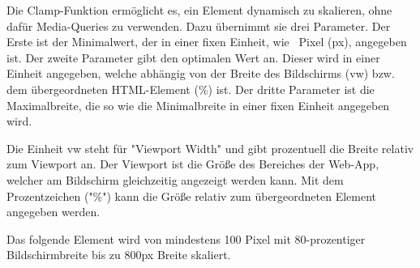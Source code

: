 \label{sec:clamp}

Die Clamp-Funktion ermöglicht es, ein Element dynamisch zu skalieren, ohne dafür Media-Queries zu verwenden. 
Dazu übernimmt sie drei Parameter. 
Der Erste ist der Minimalwert, der in einer fixen Einheit, wie \zb\ Pixel ({\ttfamily px}), angegeben ist. 
Der zweite Parameter gibt den optimalen Wert an. 
Dieser wird in einer Einheit angegeben, welche abhängig von der Breite des Bildschirms ({\ttfamily vw}) bzw. dem übergeordneten HTML-Element ({\ttfamily \%}) ist. 
Der dritte Parameter ist die Maximalbreite, die so wie die Minimalbreite in einer fixen Einheit angegeben wird. 

Die Einheit {\ttfamily vw} steht für "Viewport Width" und gibt prozentuell die Breite relativ zum Viewport an. Der Viewport ist die Größe des Bereiches der Web-App, welcher am Bildschirm gleichzeitig angezeigt werden kann. 
Mit dem Prozentzeichen ("{\ttfamily \%}") kann die Größe relativ zum übergeordneten Element angegeben werden.

Das folgende Element wird von mindestens 100 Pixel mit 80-prozentiger Bildschirmbreite bis zu 800px Breite skaliert.

